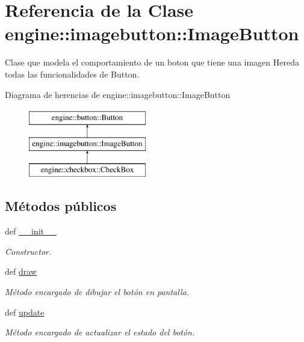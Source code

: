 \hypertarget{classengine_1_1imagebutton_1_1ImageButton}{
\section{\-Referencia de la \-Clase engine\-:\-:imagebutton\-:\-:\-Image\-Button}
\label{classengine_1_1imagebutton_1_1ImageButton}
}


\-Clase que modela el comportamiento de un boton que tiene una imagen \-Hereda todas las funcionalidades de \-Button.  


\-Diagrama de herencias de engine\-:\-:imagebutton\-:\-:\-Image\-Button\begin{figure}[H]
\begin{center}
\leavevmode
\includegraphics[height=3.000000cm]{classengine_1_1imagebutton_1_1ImageButton}
\end{center}
\end{figure}
\subsection*{\-Métodos públicos}
\begin{DoxyCompactItemize}
\item 
def \hyperlink{classengine_1_1imagebutton_1_1ImageButton_aa2f79162e40f735666791bffe8b93f51}{\-\_\-\-\_\-init\-\_\-\-\_\-}
\begin{DoxyCompactList}\small\item\em \-Constructor. \end{DoxyCompactList}\item 
def \hyperlink{classengine_1_1imagebutton_1_1ImageButton_af61b567a1d1c56239caacb5e91d47537}{draw}
\begin{DoxyCompactList}\small\item\em \-Método encargado de dibujar el botón en pantalla. \end{DoxyCompactList}\item 
\hypertarget{classengine_1_1imagebutton_1_1ImageButton_afb31e2a87031e38efa4de6cf35aa033a}{
def \hyperlink{classengine_1_1imagebutton_1_1ImageButton_afb31e2a87031e38efa4de6cf35aa033a}{update}}
\label{classengine_1_1imagebutton_1_1ImageButton_afb31e2a87031e38efa4de6cf35aa033a}

\begin{DoxyCompactList}\small\item\em \-Método encargado de actualizar el estado del botón. \end{DoxyCompactList}\end{DoxyCompactItemize}

